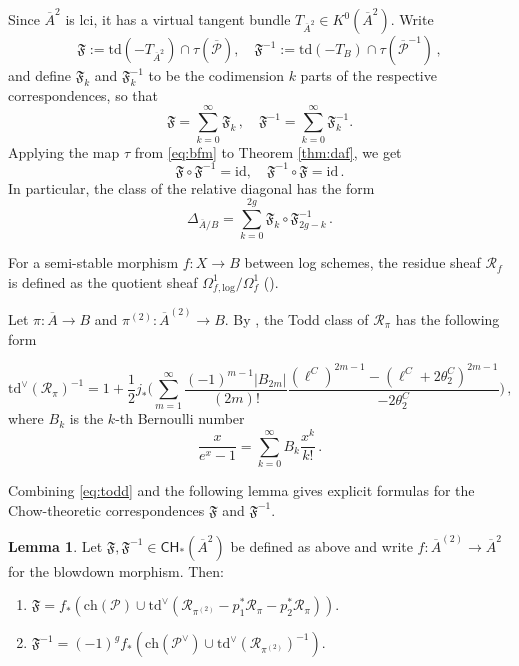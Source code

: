 \documentclass[11pt]{article}
\def\CH{\mathsf{CH}}
\def\P{\mathcal{P}}
\def\id{\mathrm{id}}
\def\ch{\mathrm{ch}}
\def\Td{\mathrm{td}}
\def\fm{\mathfrak{F}}
\def\Pbar{\overline{\mathcal{P}}}
\def\cR{\mathcal{R}}
\renewcommand{\log}{\mathrm{log}}
\newcommand{\barA}{\overline{A}}
\theoremstyle{definition}
\newtheorem{lemma}[definition]{Lemma}
\begin{document}
Since $\barA^2$ is lci, it has a virtual tangent bundle $T_{\barA^2} \in K^0(\barA^2)$. Write
\[
\fm := \Td(-T_{\barA^2})\cap \tau(\Pbar), \quad \fm^{-1} := \Td(-T_B) \cap \tau(\Pbar^{-1})\,,
\]
and define $\fm_k$ and $\fm_k^{-1}$ to be the codimension $k$ parts of the respective correspondences,
so that
\[
\fm = \sum_{k=0}^\infty \fm_k\,, \quad \fm^{-1} = \sum_{k=0}^{\infty} \fm_k^{-1}.
\]
Applying the map $\tau$ from \eqref{eq:bfm} to Theorem \ref{thm:daf}, we get
\begin{equation}\label{eq:fourier_is_iso}
\fm \circ \fm^{-1} = \id, \quad \fm^{-1} \circ \fm = \id\,.
\end{equation}
In particular, the class of the relative diagonal has the form
\begin{equation}\label{eq:diag}
    \Delta_{\barA/B} = \sum_{k=0}^{2g} \fm_k \circ \fm_{2g-k}^{-1}\,.
\end{equation}

For a semi-stable morphism $f: X\to B$ between log schemes, the residue sheaf $\cR_f$ is defined as the quotient sheaf $\Omega^1_{f,\log}/\Omega_f^1$ (\cite[\S 5]{BMP}).

Let $\pi :\barA\to B$ and $\pi^{(2)} : \barA^{(2)} \to B$. By \cite[Proposition 4.4]{BMP}, the Todd class of $\cR_\pi$ has the following form

\begin{equation}\label{eq:todd}
    \Td^\vee(\cR_\pi)^{-1} =1 + \frac{1}{2}j_*\Big(\sum_{m=1}^\infty \frac{(-1)^{m-1}|B_{2m}|}{(2m)!} \frac{(\ell^C)^{2m-1}-(\ell^C+2\theta_2^C)^{2m-1}}{-2\theta_2^C}\Big)\,,
\end{equation}
where $B_k$ is the $k$-th Bernoulli number
\begin{equation*}
    \frac{x}{e^x-1} = \sum_{k=0}^\infty B_k \frac{x^k}{k!}\,.
\end{equation*}

Combining \eqref{eq:todd} and the following lemma gives explicit formulas for the Chow-theoretic correspondences $\fm$ and $\fm^{-1}$.

\begin{lemma}\label{lem:Fchow}
    Let $\fm, \fm^{-1}\in \CH_*(\barA^2)$ be defined as above and write $f:\barA^{(2)}\to \barA^{2}$ for the blowdown
	morphism. Then:
    \begin{enumerate}[label = (\alph*)]
        \item $\fm = f_*(\ch(\P) \cup \Td^\vee(\cR_{\pi^{(2)}}- p_1^*\cR_\pi - p_2^*\cR_\pi))$.
        \item $\fm^{-1} =(-1)^g f_*(\ch(\P^{\vee}) \cup \Td^\vee(\cR_{\pi^{(2)}})^{-1})$.
    \end{enumerate}
\end{lemma}
\end{document}
